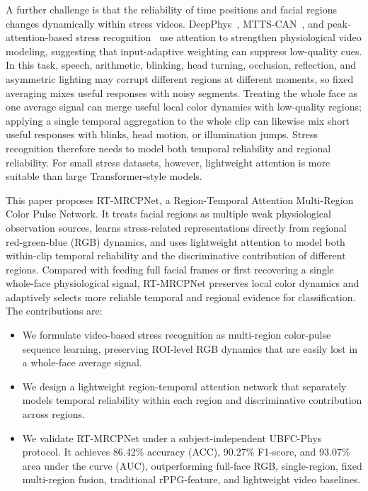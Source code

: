\documentclass[runningheads]{llncs}
\begin{document}
A further challenge is that the reliability of time positions and facial regions changes dynamically within stress videos. DeepPhys~\cite{chen2018deepphys}, MTTS-CAN~\cite{liu2020mttscan}, and peak-attention-based stress recognition~\cite{xu2024mtasr} use attention to strengthen physiological video modeling, suggesting that input-adaptive weighting can suppress low-quality cues. In this task, speech, arithmetic, blinking, head turning, occlusion, reflection, and asymmetric lighting may corrupt different regions at different moments, so fixed averaging mixes useful responses with noisy segments. Treating the whole face as one average signal can merge useful local color dynamics with low-quality regions; applying a single temporal aggregation to the whole clip can likewise mix short useful responses with blinks, head motion, or illumination jumps. Stress recognition therefore needs to model both temporal reliability and regional reliability. For small stress datasets, however, lightweight attention is more suitable than large Transformer-style models.

This paper proposes RT-MRCPNet, a Region-Temporal Attention Multi-Region Color Pulse Network. It treats facial regions as multiple weak physiological observation sources, learns stress-related representations directly from regional red-green-blue (RGB) dynamics, and uses lightweight attention to model both within-clip temporal reliability and the discriminative contribution of different regions. Compared with feeding full facial frames or first recovering a single whole-face physiological signal, RT-MRCPNet preserves local color dynamics and adaptively selects more reliable temporal and regional evidence for classification. The contributions are:
\begin{itemize}
    \item We formulate video-based stress recognition as multi-region color-pulse sequence learning, preserving ROI-level RGB dynamics that are easily lost in a whole-face average signal.
    \item We design a lightweight region-temporal attention network that separately models temporal reliability within each region and discriminative contribution across regions.
    \item We validate RT-MRCPNet under a subject-independent UBFC-Phys protocol. It achieves 86.42\% accuracy (ACC), 90.27\% F1-score, and 93.07\% area under the curve (AUC), outperforming full-face RGB, single-region, fixed multi-region fusion, traditional rPPG-feature, and lightweight video baselines.
\end{itemize}
\end{document}
